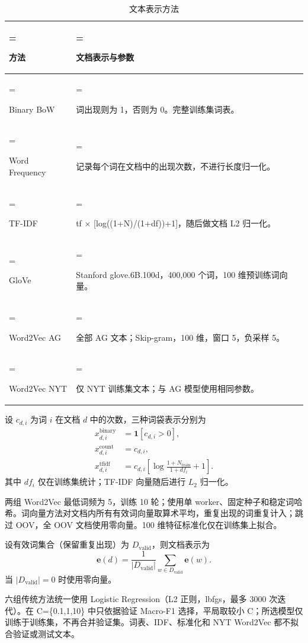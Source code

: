 \begin{table}[H]
\centering\small
\setlength{\tabcolsep}{4pt}
\renewcommand{\arraystretch}{1.2}
\caption{文本表示方法}
\label{tab:result2}
\begin{tabularx}{\linewidth}{>{\hsize=0.45361\hsize\linewidth=\hsize\raggedright\arraybackslash}X>{\hsize=1.54639\hsize\linewidth=\hsize\raggedright\arraybackslash}X}
\toprule
方法 & 文档表示与参数 \\
\midrule
Binary BoW & 词出现则为 1，否则为 0。完整训练集词表。 \\
Word Frequency & 记录每个词在文档中的出现次数，不进行长度归一化。 \\
TF-IDF & tf × [log((1+N)/(1+df))+1]，随后做文档 L2 归一化。 \\
GloVe & Stanford glove.6B.100d，400,000 个词，100 维预训练词向量。 \\
Word2Vec AG & 全部 AG 文本；Skip-gram，100 维，窗口 5，负采样 5。 \\
Word2Vec NYT & 仅 NYT 训练集文本；与 AG 模型使用相同参数。 \\
\bottomrule
\end{tabularx}
\end{table}


设 $c_{d,i}$ 为词 $i$ 在文档 $d$ 中的次数，三种词袋表示分别为
\begin{align}
x^{\mathrm{binary}}_{d,i}&=\mathbf{1}[c_{d,i}>0],\\
x^{\mathrm{count}}_{d,i}&=c_{d,i},\\
x^{\mathrm{tfidf}}_{d,i}&=c_{d,i}\left[\log\frac{1+N_{\mathrm{train}}}{1+df_i}+1\right].
\end{align}
其中 $df_i$ 仅在训练集统计；TF-IDF 向量随后进行 $L_2$ 归一化。

两组 Word2Vec 最低词频为 5，训练 10 轮；使用单 worker、固定种子和稳定词哈希。词向量方法对文档内所有有效词向量取算术平均，重复出现的词重复计入；跳过 OOV，全 OOV 文档使用零向量。100 维特征标准化仅在训练集上拟合。\cite{mikolov2013efficient,pennington2014glove}


设有效词集合（保留重复出现）为 $D_{\mathrm{valid}}$，则文档表示为
\begin{equation}
\mathbf e(d)=\frac{1}{|D_{\mathrm{valid}}|}
\sum_{w\in D_{\mathrm{valid}}}\mathbf e(w).
\end{equation}
当 $|D_{\mathrm{valid}}|=0$ 时使用零向量。

六组传统方法统一使用 Logistic Regression（L2 正则，lbfgs，最多 3000 次迭代）。在 C=\{0.1,1,10\} 中只依据验证 Macro-F1 选择，平局取较小 C；所选模型仅训练于训练集，不再合并验证集。词表、IDF、标准化和 NYT Word2Vec 都不拟合验证或测试文本。

